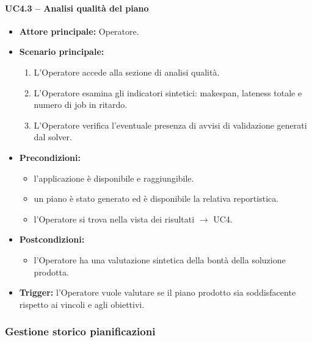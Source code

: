 \paragraph{UC4.3 -- Analisi qualità del piano}
\begin{itemize}
    \item \textbf{Attore principale:} Operatore.
    \item \textbf{Scenario principale:}
    \begin{enumerate}
        \item L'Operatore accede alla sezione di analisi qualità.
        \item L'Operatore esamina gli indicatori sintetici: makespan, lateness totale e numero di job in ritardo.
        \item L'Operatore verifica l'eventuale presenza di avvisi di validazione generati dal solver.
    \end{enumerate}
    \item \textbf{Precondizioni:}
    \begin{itemize}
        \item l'applicazione è disponibile e raggiungibile.
        \item un piano è stato generato ed è disponibile la relativa reportistica.
        \item l'Operatore si trova nella vista dei risultati $\rightarrow$ UC4.
    \end{itemize}
    \item \textbf{Postcondizioni:}
    \begin{itemize}
        \item l'Operatore ha una valutazione sintetica della bontà della soluzione prodotta.
    \end{itemize}
    \item \textbf{Trigger:} l'Operatore vuole valutare se il piano prodotto sia soddisfacente rispetto ai vincoli e agli obiettivi.
\end{itemize}

\subsubsection{Gestione storico pianificazioni}

